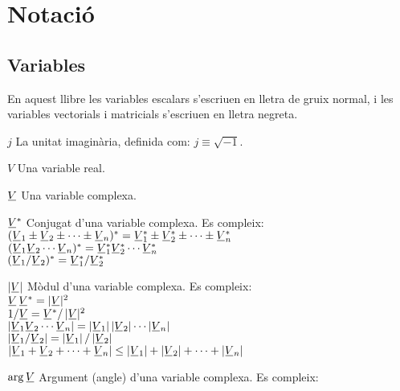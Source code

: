 \chapter*{Notació} 

\section*{Variables} 


En aquest llibre les variables escalars s'escriuen en lletra  de gruix normal, i  les variables vectorials i matricials s'escriuen
en lletra negreta.

\begin{list}{}
{\setlength{\labelwidth}{15mm} \setlength{\leftmargin}{20mm}
\setlength{\labelsep}{5mm}}
    \item[$j$] La unitat imaginària, definida com:
    $j\equiv\sqrt{-1}$.
    \item[$V$] Una variable real.
    \item[$\cmplx{V}$] Una variable complexa.
    \item[$\cmplx{V}^*$] Conjugat d'una variable complexa.
    Es compleix:\\[1ex]
     $(\cmplx{V}_1 \pm \cmplx{V}_2 \pm \cdots  \pm \cmplx{V}_n)^* = \cmplx{V}_1^* \pm
    \cmplx{V}_2^*\pm\cdots\pm\cmplx{V}_n^*$\\[1ex]
    $(\cmplx{V}_1 \cmplx{V}_2 \cdots \cmplx{V}_n)^* = \cmplx{V}_1^*  \cmplx{V}_2^*
    \cdots \cmplx{V}_n^*$\\[1ex]
    $(\cmplx{V}_1 / \cmplx{V}_2)^* = \cmplx{V}_1^* / \cmplx{V}_2^*$
    \item[$|\cmplx{V}|$] Mòdul d'una variable complexa.
    Es compleix:\\[1ex]
      $\cmplx{V}\,\cmplx{V}^* = |\cmplx{V}|^2$\\[1ex]
      $1/ \cmplx{V} = \cmplx{V}^* / \,|\cmplx{V}|^2$\\[1ex]
      $|\cmplx{V}_1 \cmplx{V}_2 \cdots \cmplx{V}_n| =
       |\cmplx{V}_1| \,|\cmplx{V}_2| \cdots |\cmplx{V}_n|$\\[1ex]
       $|\cmplx{V}_1 / \cmplx{V}_2| = |\cmplx{V}_1| \,/ \,|\cmplx{V}_2|$\\[1ex]
      $|\cmplx{V}_1+\cmplx{V}_2+\cdots+\cmplx{V}_n| \leq
      |\cmplx{V}_1| + |\cmplx{V}_2| + \cdots  +|\cmplx{V}_n|$
    \item[$\arg\cmplx{V}$] Argument (angle) d'una variable complexa.
     Es compleix:\\[1ex]

\end{list}
